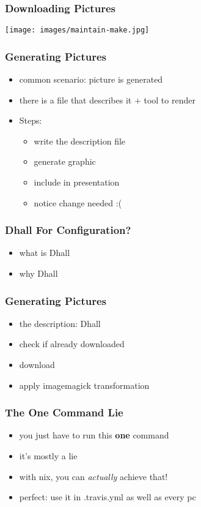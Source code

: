 \documentclass{beamer}
\begin{document}
\begin{frame}
  \frametitle{Downloading Pictures}
  \texttt{[image: images/maintain-make.jpg]}
\end{frame}

\begin{frame}
  \frametitle{Generating Pictures}
  \begin{itemize}
  \item common scenario: picture is generated
  \item there is a file that describes it + tool to render
  \item Steps:
    \begin{itemize}
    \item write the description file
    \item generate graphic
    \item include in presentation
    \item notice change needed :(
    \end{itemize}
  \end{itemize}
\end{frame}

\begin{frame}
  \frametitle{Dhall For Configuration?}
  \begin{itemize}
  \item what is Dhall
  \item why Dhall
  \end{itemize}
\end{frame}

\begin{frame}
  \frametitle{Generating Pictures}
  \begin{itemize}
  \item the description: Dhall
  \item check if already downloaded
  \item download
  \item apply imagemagick transformation
  \end{itemize}
\end{frame}

\begin{frame}
  \frametitle{The One Command Lie}
  \begin{itemize}
  \item you just have to run this \textbf{one} command
  \item it's mostly a lie
  \item with nix, you can \textit{actually} achieve that!
  \item perfect: use it in .travis.yml as well as every pc
  \end{itemize}
\end{frame}
\end{document}
